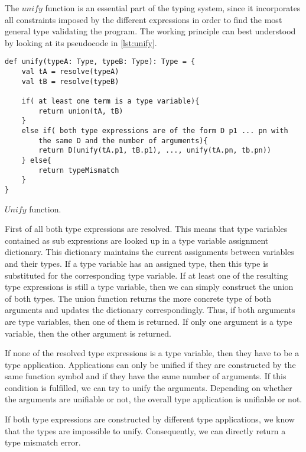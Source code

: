 The $unify$ function is an essential part of the typing system, since it incorporates all constraints imposed by the different expressions in order to find the most general type validating the program.
The working principle can best understood by looking at its pseudocode in \cref{lst:unify}.
\begin{listing}[!h]
	\begin{CenteredBox}
		\begin{lstlisting}[language=inform]
def unify(typeA: Type, typeB: Type): Type = {
	val tA = resolve(typeA)
	val tB = resolve(typeB)

	if( at least one term is a type variable){
		return union(tA, tB)
	}
    else if( both type expressions are of the form D p1 ... pn with 
		the same D and the number of arguments){
		return D(unify(tA.p1, tB.p1), ..., unify(tA.pn, tb.pn))
	} else{
		return typeMismatch
	}
}
		\end{lstlisting}
	\end{CenteredBox}
	\caption{$Unify$ function.}
	\label{lst:unify}
\end{listing}

First of all both type expressions are resolved.
This means that type variables contained as sub expressions are looked up in a type variable assignment dictionary.
This dictionary maintains the current assignments between variables and their types.
If a type variable has an assigned type, then this type is substituted for the corresponding type variable.
If at least one of the resulting type expressions is still a type variable, then we can simply construct the union of both types.
The union function returns the more concrete type of both arguments and updates the dictionary correspondingly.
Thus, if both arguments are type variables, then one of them is returned.
If only one argument is a type variable, then the other argument is returned.

If none of the resolved type expressions is a type variable, then they have to be a type application.
Applications can only be unified if they are constructed by the same function symbol and if they have the same number of arguments.
If this condition is fulfilled, we can try to unify the arguments.
Depending on whether the arguments are unifiable or not, the overall type application is unifiable or not.

If both type expressions are constructed by different type applications, we know that the types are impossible to unify.
Consequently, we can directly return a type mismatch error.

